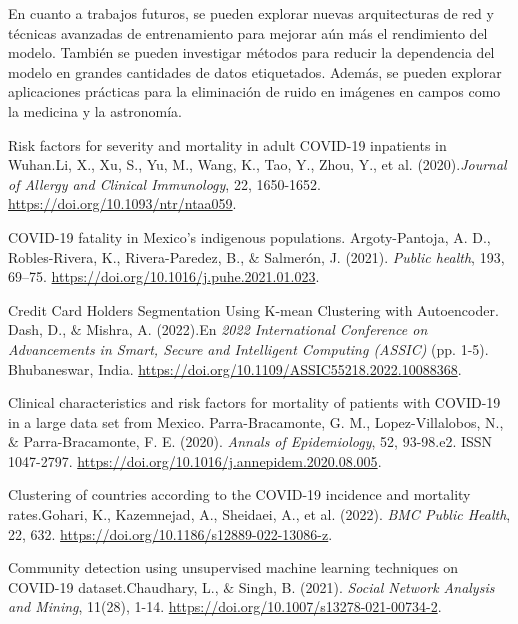 \documentclass[a4paper,
               ]{jacow}
\begin{document}
En cuanto a trabajos futuros, se pueden explorar nuevas arquitecturas de red y técnicas avanzadas de entrenamiento para mejorar aún más el rendimiento del modelo. También se pueden investigar métodos para reducir la dependencia del modelo en grandes cantidades de datos etiquetados. Además, se pueden explorar aplicaciones prácticas para la eliminación de ruido en imágenes en campos como la medicina y la astronomía.
%
%
%
	{\printbibliography}%
	{
	\begin{thebibliography}{20} %
        Risk factors for severity and mortality in adult COVID-19 inpatients in Wuhan.Li, X., Xu, S., Yu, M., Wang, K., Tao, Y., Zhou, Y., et al. (2020).\textit{Journal of Allergy and Clinical Immunology}, 22, 1650-1652. \url{https://doi.org/10.1093/ntr/ntaa059}.

        COVID-19 fatality in Mexico's indigenous populations. Argoty-Pantoja, A. D., Robles-Rivera, K., Rivera-Paredez, B., $\&$ Salmerón, J. (2021). \textit{Public health}, 193, 69–75. \url{https://doi.org/10.1016/j.puhe.2021.01.023}.

        Credit Card Holders Segmentation Using K-mean Clustering with Autoencoder. Dash, D., $\&$  Mishra, A. (2022).En \textit{2022 International Conference on Advancements in Smart, Secure and Intelligent Computing (ASSIC)} (pp. 1-5). Bhubaneswar, India. \url{https://doi.org/10.1109/ASSIC55218.2022.10088368}.

        Clinical characteristics and risk factors for mortality of patients with COVID-19 in a large data set from Mexico. Parra-Bracamonte, G. M., Lopez-Villalobos, N., $\&$ Parra-Bracamonte, F. E. (2020). \textit{Annals of Epidemiology}, 52, 93-98.e2. ISSN 1047-2797. \url{https://doi.org/10.1016/j.annepidem.2020.08.005}.


        Clustering of countries according to the COVID-19 incidence and mortality rates.Gohari, K., Kazemnejad, A., Sheidaei, A., et al. (2022). \textit{BMC Public Health}, 22, 632. \url{https://doi.org/10.1186/s12889-022-13086-z}.


        Community detection using unsupervised machine learning techniques on COVID-19 dataset.Chaudhary, L., $\&$ Singh, B. (2021). \textit{Social Network Analysis and Mining}, 11(28), 1-14. \url{https://doi.org/10.1007/s13278-021-00734-2}.



	\end{thebibliography}
} %
%
%

\end{document}
